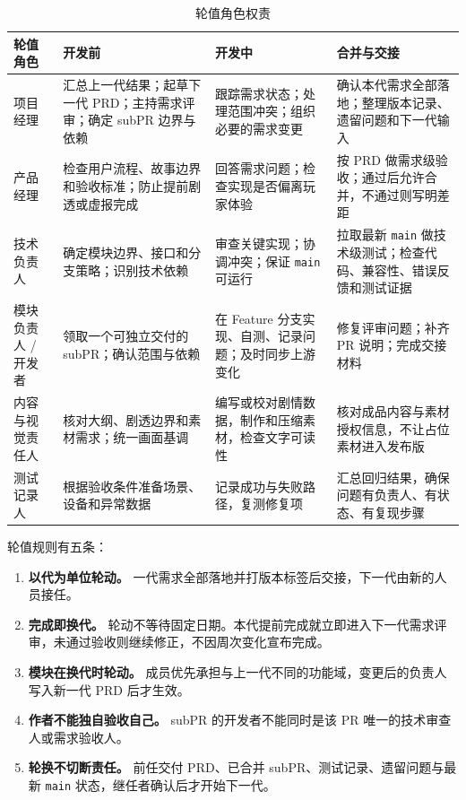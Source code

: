 \begin{table}[htbp]
\centering
\caption{轮值角色权责}
\small
\begin{tabularx}{\linewidth}{@{}l X X X@{}}
\toprule
轮值角色 & 开发前 & 开发中 & 合并与交接 \\
\midrule
项目经理 & 汇总上一代结果；起草下一代 PRD；主持需求评审；确定 subPR 边界与依赖 & 跟踪需求状态；处理范围冲突；组织必要的需求变更 & 确认本代需求全部落地；整理版本记录、遗留问题和下一代输入 \\
产品经理 & 检查用户流程、故事边界和验收标准；防止提前剧透或虚报完成 & 回答需求问题；检查实现是否偏离玩家体验 & 按 PRD 做需求级验收；通过后允许合并，不通过则写明差距 \\
技术负责人 & 确定模块边界、接口和分支策略；识别技术依赖 & 审查关键实现；协调冲突；保证 \texttt{main} 可运行 & 拉取最新 \texttt{main} 做技术级测试；检查代码、兼容性、错误反馈和测试证据 \\
模块负责人 / 开发者 & 领取一个可独立交付的 subPR；确认范围与依赖 & 在 Feature 分支实现、自测、记录问题；及时同步上游变化 & 修复评审问题；补齐 PR 说明；完成交接材料 \\
内容与视觉责任人 & 核对大纲、剧透边界和素材需求；统一画面基调 & 编写或校对剧情数据，制作和压缩素材，检查文字可读性 & 核对成品内容与素材授权信息，不让占位素材进入发布版 \\
测试记录人 & 根据验收条件准备场景、设备和异常数据 & 记录成功与失败路径，复测修复项 & 汇总回归结果，确保问题有负责人、有状态、有复现步骤 \\
\bottomrule
\end{tabularx}
\end{table}

轮值规则有五条：

\begin{enumerate}
  \item \textbf{以代为单位轮动。} 一代需求全部落地并打版本标签后交接，下一代由新的人员接任。
  \item \textbf{完成即换代。} 轮动不等待固定日期。本代提前完成就立即进入下一代需求评审，未通过验收则继续修正，不因周次变化宣布完成。
  \item \textbf{模块在换代时轮动。} 成员优先承担与上一代不同的功能域，变更后的负责人写入新一代 PRD 后才生效。
  \item \textbf{作者不能独自验收自己。} subPR 的开发者不能同时是该 PR 唯一的技术审查人或需求验收人。
  \item \textbf{轮换不切断责任。} 前任交付 PRD、已合并 subPR、测试记录、遗留问题与最新 \texttt{main} 状态，继任者确认后才开始下一代。
\end{enumerate}

